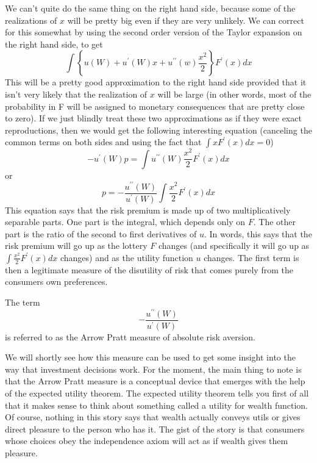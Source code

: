 \documentclass[12pt]{article}
\begin{document}
We can't quite do the same thing on the right hand side, because some of the
realizations of $x$ will be pretty big even if they are very unlikely. We can
correct for this somewhat by using the second order version of the Taylor
expansion on the right hand side, to get%
\[
\int\left\{  u\left(  W\right)  +u^{\prime}\left(  W\right)  x+u^{\prime
\prime}\left(  w\right)  \frac{x^{2}}{2}\right\}  F^{\prime}\left(  x\right)
dx
\]
This will be a pretty good approximation to the right hand side provided that
it isn't very likely that the realization of $x$ will be large (in other
words, most of the probability in F will be assigned to monetary consequences
that are pretty close to zero). If we just blindly treat these two
approximations as if they were exact reproductions, then we would get the
following interesting equation (canceling the common terms on both sides and
using the fact that $\int xF^{\prime}\left(  x\right)  dx=0$)%
\[
-u^{\prime}\left(  W\right)  p=\int u^{\prime\prime}\left(  W\right)
\frac{x^{2}}{2}F^{\prime}\left(  x\right)  dx
\]
or
\[
p=-\frac{u^{\prime\prime}\left(  W\right)  }{u^{\prime}\left(  W\right)  }%
\int\frac{x^{2}}{2}F^{\prime}\left(  x\right)  dx
\]
This equation says that the risk premium is made up of two multiplicatively
separable parts. One part is the integral, which depends only on $F$. The
other part is the ratio of the second to first derivatives of $u$. In words,
this says that the risk premium will go up as the lottery $F$ changes (and
specifically it will go up as $\int\frac{x^{2}}{2}F^{\prime}\left(  x\right)
dx$ changes) and as the utility function $u$ changes. The first term is then a
legitimate measure of the disutility of risk that comes purely from the
consumers own preferences.

The term%
\[
-\frac{u^{\prime\prime}\left(  W\right)  }{u^{\prime}\left(  W\right)  }%
\]
is referred to as the Arrow Pratt measure of absolute risk aversion.

We will shortly see how this measure can be used to get some insight into the
way that investment decisions work. For the moment, the main thing to note is
that the Arrow Pratt measure is a conceptual device that emerges with the help
of the expected utility theorem. The expected utility theorem tells you first
of all that it makes sense to think about something called a utility for
wealth function. Of course, nothing in this story says that wealth actually
conveys utils or gives direct pleasure to the person who has it. The gist of
the story is that consumers whose choices obey the independence axiom will act
as if wealth gives them pleasure.
\end{document}
